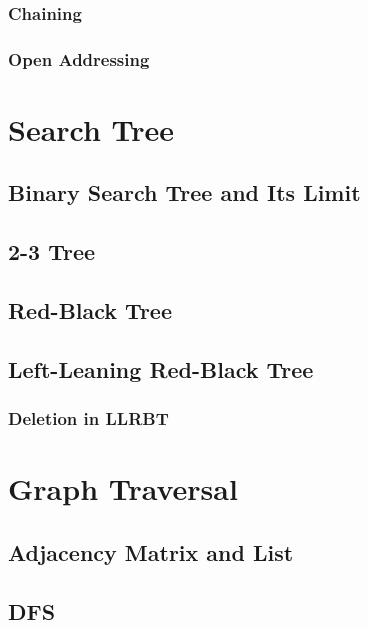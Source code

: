\documentclass{report}
\begin{document}
\subsection{Chaining}

\subsection{Open Addressing}


\chapter{Search Tree}

\section{Binary Search Tree and Its Limit}

\section{2-3 Tree}

\section{Red-Black Tree}

\section{Left-Leaning Red-Black Tree}

\subsection{Deletion in LLRBT}


\chapter{Graph Traversal}

\section{Adjacency Matrix and List}

\section{DFS}
\end{document}
